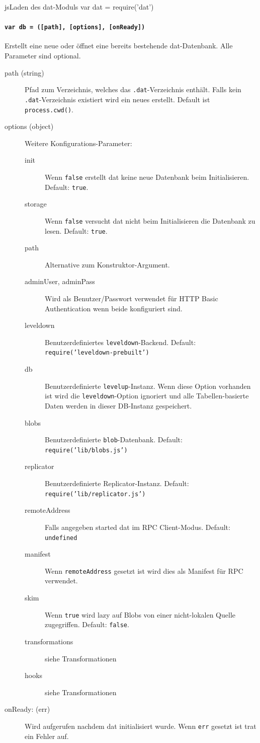 \begin{srclst}{js}{Laden des dat-Moduls}
var dat = require('dat')
\end{srclst}

\paragraph{\texttt{var db = ([path], [options], [onReady])}}

Erstellt eine neue oder öffnet eine bereits bestehende dat-Datenbank. Alle Parameter sind optional.

\begin{description}
\item[path (string)] Pfad zum Verzeichnis, welches das \texttt{.dat}-Verzeichnis enthält. Falls kein \texttt{.dat}-Verzeichnis existiert wird ein neues erstellt. Default ist \texttt{process.cwd()}.
\item[options (object)] Weitere Konfigurations-Parameter:
    \begin{description}
    \item[init] Wenn \texttt{false} erstellt dat keine neue Datenbank beim Initialisieren. Default: \texttt{true}.
    \item[storage] Wenn \texttt{false} versucht dat nicht beim Initialisieren die Datenbank zu lesen. Default: \texttt{true}.
    \item[path] Alternative zum Konstruktor-Argument.
    \item[adminUser, adminPass] Wird als Benutzer/Passwort verwendet für HTTP Basic Authentication wenn beide konfiguriert sind.
    \item[leveldown] Benutzerdefiniertes \texttt{leveldown}-Backend. Default: \texttt{require('leveldown-prebuilt')}
    \item[db] Benutzerdefinierte \texttt{levelup}-Instanz. Wenn diese Option vorhanden ist wird die \texttt{leveldown}-Option ignoriert und alle Tabellen-basierte Daten werden in dieser DB-Instanz gespeichert.
    \item[blobs] Benutzerdefinierte \texttt{blob}-Datenbank. Default: \texttt{require('lib/blobs.js')}
    \item[replicator] Benutzerdefinierte Replicator-Instanz. Default: \texttt{require('lib/replicator.js')}
    \item[remoteAddress] Falls angegeben started dat im RPC Client-Modus. Default: \texttt{undefined}
    \item[manifest] Wenn \texttt{remoteAddress} gesetzt ist wird dies als Manifest für RPC verwendet.
    \item[skim] Wenn \texttt{true} wird lazy auf Blobs von einer nicht-lokalen Quelle zugegriffen. Default: \texttt{false}.
    \item[transformations] siehe Transformationen
    \item[hooks] siehe Transformationen
    \end{description}
\item[onReady: (err)] Wird aufgerufen nachdem dat initialisiert wurde. Wenn \texttt{err} gesetzt ist trat ein Fehler auf.
\end{description}
 
